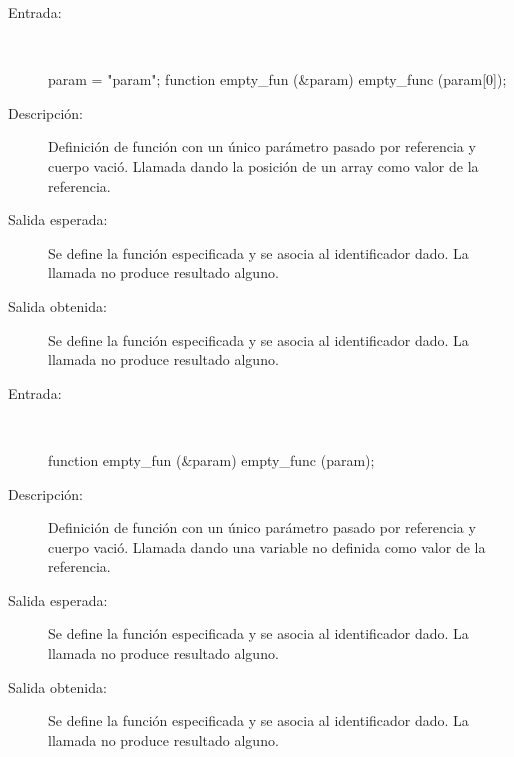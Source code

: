 	\begin{description}
		\item [Entrada:] \hfill \\
\begin{myverbatim}
   param = {"param"};
   function empty_fun (&param) { } 
   empty_func (param[0]);
\end{myverbatim}
		\item [Descripción:] Definición de función con un único parámetro pasado por referencia y cuerpo vació. Llamada dando la posición de un array como valor de la referencia.
		\item [Salida esperada:] Se define la función especificada y se asocia al identificador dado. La llamada no produce resultado alguno.
		\item [Salida obtenida:] Se define la función especificada y se asocia al identificador dado. La llamada no produce resultado alguno.
	\end{description}

	\begin{description}
		\item [Entrada:] \hfill \\
\begin{myverbatim}
   function empty_fun (&param) { } 
   empty_func (param);
\end{myverbatim}
		\item [Descripción:] Definición de función con un único parámetro pasado por referencia y cuerpo vació. Llamada dando una variable no definida como valor de la referencia.
		\item [Salida esperada:] Se define la función especificada y se asocia al identificador dado. La llamada no produce resultado alguno.
		\item [Salida obtenida:] Se define la función especificada y se asocia al identificador dado. La llamada no produce resultado alguno.
	\end{description}

